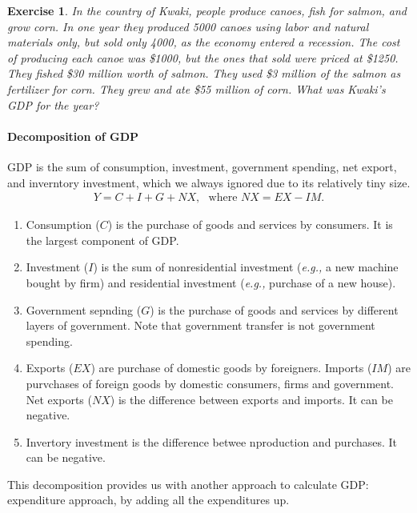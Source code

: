 \documentclass[12pt]{article}
\newtheorem{exercise}{Exercise}
\numberwithin{equation}{section}
\begin{document}
\begin{exercise}
    In the country of Kwaki, people produce canoes, fish for salmon, and grow corn. In one year they produced 5000 canoes using labor and natural materials only, but sold only 4000, as the economy entered a recession. The cost of producing each canoe was \$1000, but the ones that sold were priced at \$1250. They fished \$30 million worth of salmon. They used \$3 million of the salmon as fertilizer for corn. They grew and ate \$55 million of corn. What was Kwaki's GDP for the year?
\end{exercise}


\paragraph{Decomposition of GDP}
GDP is the sum of consumption, investment, government spending, net export, and inverntory investment, which we always ignored due to its relatively tiny size.
\begin{align*}
    Y = C + I + G + NX,\,\,\,\, \text{where } NX = EX - IM.
\end{align*}
\begin{enumerate}[label=(\arabic*)]
    \item Consumption ($C$) is the purchase of goods and services by consumers. It is the largest component of GDP.
    \item Investment ($I$) is the sum of nonresidential investment (\textit{e.g.,} a new machine bought by firm) and residential investment (\textit{e.g., }purchase of a new house). 
    \item Government sepnding ($G$) is the purchase of goods and services by different layers of government. Note that government transfer is not government spending.
    \item Exports ($EX$) are purchase of domestic goods by foreigners. Imports ($IM$) are purvchases of foreign goods by domestic consumers, firms and government. Net exports ($NX$) is the difference between exports and imports. It can be negative. 
    \item Invertory investment is the difference betwee nproduction and purchases. It can be negative.
\end{enumerate}

This decomposition provides us with another approach to calculate GDP: expenditure approach, by adding all the expenditures up.
\end{document}
